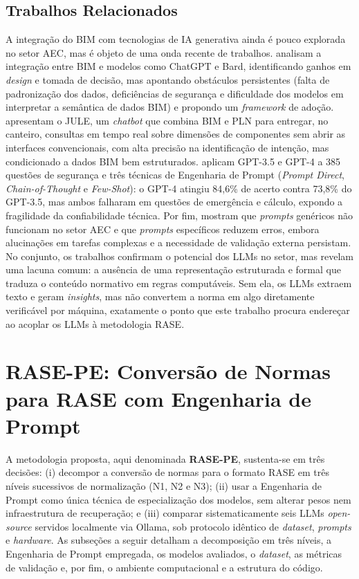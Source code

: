 \documentclass[a4paper,fleqn]{cas-sc}
\begin{document}
\subsection{Trabalhos Relacionados}\label{sec:trabalhos-relacionados}
A integração do BIM com tecnologias de IA generativa ainda é pouco explorada no setor AEC, mas é objeto de uma onda recente de trabalhos. \citet{rane2023} analisam a integração entre BIM e modelos como ChatGPT e Bard, identificando ganhos em \textit{design} e tomada de decisão, mas apontando obstáculos persistentes (falta de padronização dos dados, deficiências de segurança e dificuldade dos modelos em interpretar a semântica de dados BIM) e propondo um \textit{framework} de adoção. \citet{lin2023} apresentam o JULE, um \textit{chatbot} que combina BIM e PLN para entregar, no canteiro, consultas em tempo real sobre dimensões de componentes sem abrir as interfaces convencionais, com alta precisão na identificação de intenção, mas condicionado a dados BIM bem estruturados. \citet{sammou2024} aplicam GPT-3.5 e GPT-4 a 385 questões de segurança e três técnicas de Engenharia de Prompt (\textit{Prompt Direct}, \textit{Chain-of-Thought} e \textit{Few-Shot}): o GPT-4 atingiu 84,6\% de acerto contra 73,8\% do GPT-3.5, mas ambos falharam em questões de emergência e cálculo, expondo a fragilidade da confiabilidade técnica. Por fim, \citet{samsami2024} mostram que \textit{prompts} genéricos não funcionam no setor AEC e que \textit{prompts} específicos reduzem erros, embora alucinações em tarefas complexas e a necessidade de validação externa persistam. No conjunto, os trabalhos confirmam o potencial dos LLMs no setor, mas revelam uma lacuna comum: a ausência de uma representação estruturada e formal que traduza o conteúdo normativo em regras computáveis. Sem ela, os LLMs extraem texto e geram \textit{insights}, mas não convertem a norma em algo diretamente verificável por máquina, exatamente o ponto que este trabalho procura endereçar ao acoplar os LLMs à metodologia RASE.

\section{RASE-PE: Conversão de Normas para RASE com Engenharia de Prompt}\label{sec:metodologia}
A metodologia proposta, aqui denominada \textbf{RASE-PE}, sustenta-se em três decisões: (i) decompor a conversão de normas para o formato RASE em três níveis sucessivos de normalização (N1, N2 e N3); (ii) usar a Engenharia de Prompt como única técnica de especialização dos modelos, sem alterar pesos nem infraestrutura de recuperação; e (iii) comparar sistematicamente seis LLMs \textit{open-source} servidos localmente via Ollama, sob protocolo idêntico de \textit{dataset}, \textit{prompts} e \textit{hardware}. As subseções a seguir detalham a decomposição em três níveis, a Engenharia de Prompt empregada, os modelos avaliados, o \textit{dataset}, as métricas de validação e, por fim, o ambiente computacional e a estrutura do código.
\end{document}
